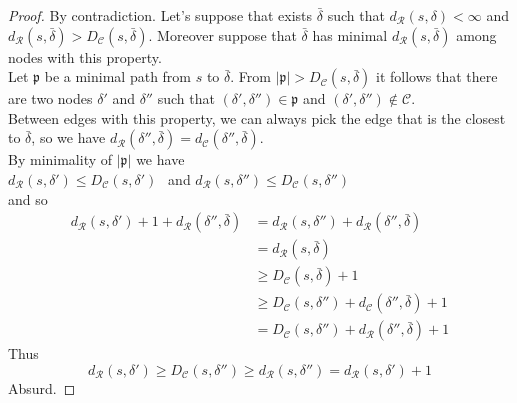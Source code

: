 \documentclass{article}
\theoremstyle{plain}
\theoremstyle{definition}
\theoremstyle{remark}
\begin{document}
\begin{proof}
By contradiction. Let's suppose that exists $\bar\delta$ such that $d_\mathcal{R}(s, \delta)<\infty$ and $d_\mathcal{R}(s,\bar\delta)>D_\mathcal{C}(s, \bar\delta)$.  Moreover suppose that $\bar\delta$ has minimal $d_\mathcal{R}(s, \bar\delta)$ among nodes with this property.\\
Let $\mathfrak{p}$ be a minimal path from $s$ to $\bar\delta$. From $|\mathfrak{p}|>D_\mathcal{C}(s, \bar\delta)$ it follows that there are two nodes $\delta'$ and $\delta''$ such that $(\delta', \delta'')\in \mathfrak{p}$ and $(\delta', \delta'')\not\in\mathcal{C}$. \\
Between edges with  this property, we can always pick the edge that is the closest to $\bar\delta$, so we have $d_\mathcal{R}(\delta'', \bar\delta) = d_\mathcal{C}(\delta'', \bar\delta)$.\\
By minimality of $|\mathfrak{p}|$ we have \\
$d_\mathcal{R}(s, \delta')\le D_\mathcal{C}(s, \delta')\ \ $ and 
$d_\mathcal{R}(s, \delta'')\le D_\mathcal{C}(s, \delta'')$\\

and so 
\begin{equation*}
\begin{split}
d_\mathcal{R}(s, \delta') + 1 + d_\mathcal{R}(\delta'', \bar\delta) &= d_\mathcal{R}(s, \delta'') +  d_\mathcal{R}(\delta'', \bar\delta)\\
  &=  d_\mathcal{R}(s, \bar\delta)\\
  &\ge D_\mathcal{C}(s, \bar\delta) + 1\\
  &\ge D_\mathcal{C}(s, \delta'') + d_\mathcal{C}(\delta'',\bar\delta) + 1 \\
  &= D_\mathcal{C}(s, \delta'') + d_\mathcal{R}(\delta'',\bar\delta) + 1
\end{split}
\end{equation*}
Thus
\begin{equation*}
 d_\mathcal{R}(s, \delta') \ge D_\mathcal{C}(s, \delta'') \ge d_\mathcal{R}(s, \delta'') = d_\mathcal{R}(s, \delta') + 1
\end{equation*}
Absurd.
\end{proof}
\end{document}
